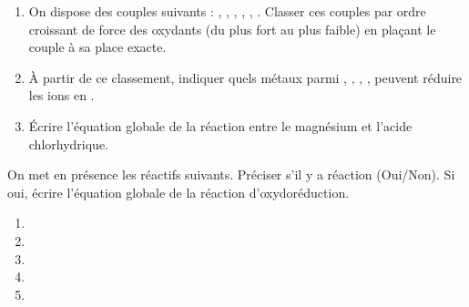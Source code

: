 \documentclass[11pt]{article}
\begin{document}
\begin{exercice}
\begin{enumerate}
    \item On dispose des couples suivants : , , , , , .
    Classer ces couples par ordre croissant de force des oxydants (du plus fort au plus faible) en plaçant le couple  à sa place exacte.
    \item À partir de ce classement, indiquer quels métaux parmi , , , ,  peuvent réduire les ions  en .
    \item Écrire l'équation globale de la réaction entre le magnésium et l'acide chlorhydrique.
\end{enumerate}
\end{exercice}

\begin{exercice}
On met en présence les réactifs suivants. Préciser s'il y a réaction (Oui/Non). Si oui, écrire l'équation globale de la réaction d'oxydoréduction.
\begin{enumerate}
    \item {}
    \item {}
    \item {}
    \item {}
    \item {}
\end{enumerate}
\end{exercice}
\end{document}
